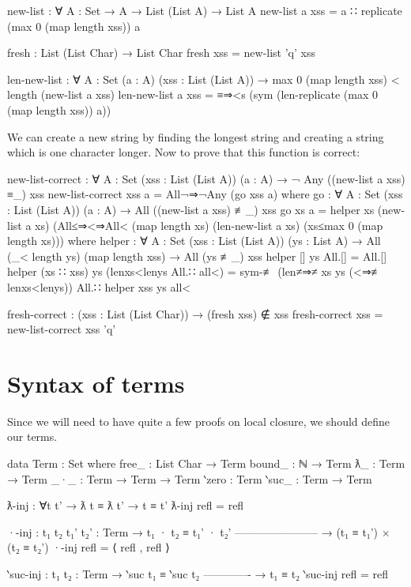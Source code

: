 \begin{code}
  new-list : ∀ {A : Set} → A → List (List A) → List A
  new-list a xss = a ∷ replicate (max 0 (map length xss)) a

  fresh : List (List Char) → List Char
  fresh xss = new-list 'q' xss

  len-new-list : ∀ {A : Set} (a : A) (xss : List (List A))
    → max 0 (map length xss) < length (new-list a xss)
  len-new-list a xss =
    ≡⇒<s (sym (len-replicate (max 0 (map length xss)) a))
\end{code}

We can create a new string by finding the longest string and creating a string which is one
character longer. Now to prove that this function is correct:

\begin{code}
  new-list-correct :
    ∀ {A : Set} (xss : List (List A)) (a : A)
    → ¬ Any ((new-list a xss) ≡_) xss
  new-list-correct xss a = All¬⇒¬Any (go xss a)
    where
      go : ∀ {A : Set} (xss : List (List A)) (a : A)
        → All ((new-list a xss) ≢_) xss
      go xs a =
        helper
          xs
          (new-list a xs)
          (All≤⇒<⇒All<
            (map length xs)
            (len-new-list a xs)
            (xs≤max 0 (map length xs)))
        where
          helper : ∀ {A : Set} (xss : List (List A)) (ys : List A)
            → All (_< length ys) (map length xss)
            → All (ys ≢_) xss
          helper [] ys All.[] = All.[]
          helper (xs ∷ xss) ys (lenxs<lenys All.∷ all<) =
            sym-≢ (len≠⇒≠ xs ys (<⇒≢ lenxs<lenys))
              All.∷ helper xss ys all<

  fresh-correct : (xss : List (List Char)) → (fresh xss) ∉ xss
  fresh-correct xss = new-list-correct xss 'q'
\end{code}

\section{Syntax of terms}
\label{section:stlc_terms}
Since we will need to have quite a few proofs on local closure, we should define our terms.
\begin{code}
  data Term : Set where
    free_  : List Char → Term
    bound_ : ℕ → Term
    ƛ_     : Term → Term
    _·_    : Term → Term → Term
    ‵zero  : Term
    ‵suc_  : Term → Term

  ƛ-inj : ∀{t t'} → ƛ t ≡ ƛ t' → t ≡ t'
  ƛ-inj refl = refl

  ·-inj : {t₁ t₂ t₁' t₂' : Term}
    → t₁ · t₂ ≡ t₁' · t₂'
      -----------------------
    → (t₁ ≡ t₁') × (t₂ ≡ t₂')
  ·-inj refl = ⟨ refl , refl ⟩

  ‵suc-inj : {t₁ t₂ : Term}
    → ‵suc t₁ ≡ ‵suc t₂
      -------------
    → t₁ ≡ t₂
  ‵suc-inj refl = refl
\end{code}

